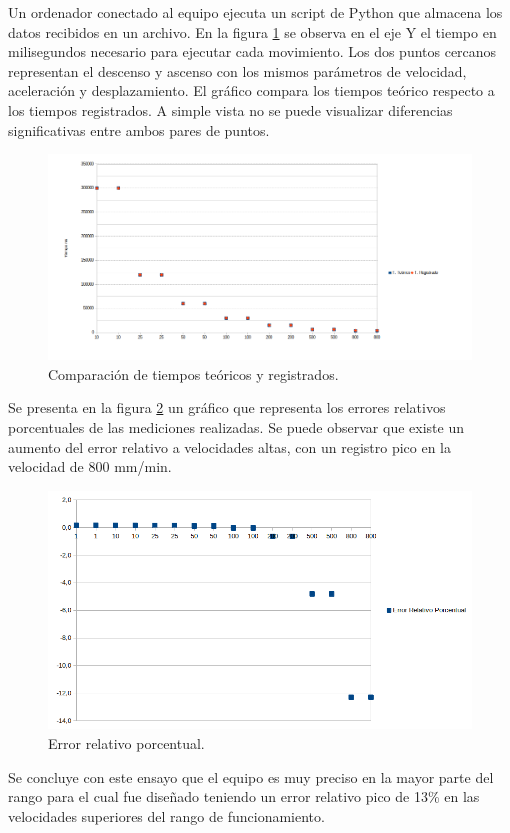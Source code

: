 Un ordenador conectado al equipo ejecuta un script de Python que almacena los datos recibidos en un archivo.
En la figura \ref{fig:tiempo_movimiento_1} se observa en el eje Y el tiempo en milisegundos necesario para ejecutar cada movimiento. Los dos puntos cercanos representan el descenso y ascenso con los mismos parámetros de velocidad, aceleración y desplazamiento. El gráfico compara los tiempos teórico respecto a los tiempos registrados. A simple vista no se puede visualizar diferencias significativas entre ambos pares de puntos.

\begin{figure}[h]
\centering 
\includegraphics[width=1.2\textwidth]{./Figures/tiempo_movimiento_1.png}
\caption{Comparación de tiempos teóricos y registrados.}
\label{fig:tiempo_movimiento_1}
\end{figure}

Se presenta en la figura \ref{fig:error_porcentual_1} un gráfico que representa los errores relativos porcentuales de las mediciones realizadas. Se puede observar que existe un aumento del error relativo a velocidades altas, con un registro pico  en la velocidad de 800 mm/min. 


\begin{figure}[h]
\centering 
\includegraphics[width=1\textwidth]{./Figures/error.png}
\caption{Error relativo porcentual.}
\label{fig:error_porcentual_1}
\end{figure}
Se concluye con este ensayo que el equipo es muy preciso en la mayor parte del rango para el cual fue diseñado teniendo un error relativo pico de 13\% en las velocidades superiores del rango de funcionamiento.
 
